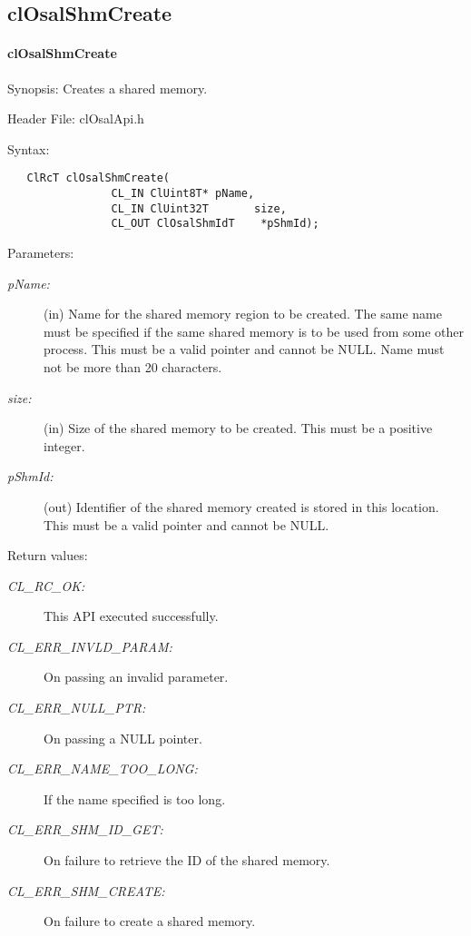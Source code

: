 \newpage

\subsection{clOsalShmCreate}
\hypertarget{pageosal145}{}\paragraph{cl\-Osal\-Shm\-Create}\label{pageosal145}
\begin{Desc}
\item[Synopsis:]Creates a shared memory.\end{Desc}
\begin{Desc}
\item[Header File:]clOsalApi.h\end{Desc}
\begin{Desc}
\item[Syntax:]

\footnotesize\begin{verbatim}   ClRcT clOsalShmCreate(
                CL_IN ClUint8T* pName,
                CL_IN ClUint32T       size,
                CL_OUT ClOsalShmIdT    *pShmId);
\end{verbatim}
\normalsize
\end{Desc}
\begin{Desc}
\item[Parameters:]
\begin{description}
\item[{\em p\-Name:}](in) Name for the shared memory region to be created. The same name must be specified if the same shared memory is to be used from 
some other process. This must be a valid pointer and cannot be NULL. Name must not be more than 20 characters.\item[{\em size:}](in) Size of the shared
memory to be created. This must be a positive integer.\item[{\em p\-Shm\-Id:}](out) Identifier of the shared memory created is stored in this location. This must be a valid pointer and cannot be NULL.\end{description}
\end{Desc}
\begin{Desc}
\item[Return values:]
\begin{description}
\item[{\em CL\_\-RC\_\-OK:}]This API executed successfully. \item[{\em CL\_\-ERR\_\-INVLD\_\-PARAM:}]On passing an invalid parameter. \item[{\em CL\_\-ERR\_\-NULL\_\-PTR:}]On passing a NULL pointer. \item[{\em CL\_\-ERR\_\-NAME\_\-TOO\_\-LONG:}]If the name specified is too long. \item[{\em CL\_\-ERR\_\-SHM\_\-ID\_\-GET:}]On failure to retrieve the ID of the shared memory. \item[{\em CL\_\-ERR\_\-SHM\_\-CREATE:}]On failure to create a shared memory.\end{description}
\end{Desc}
